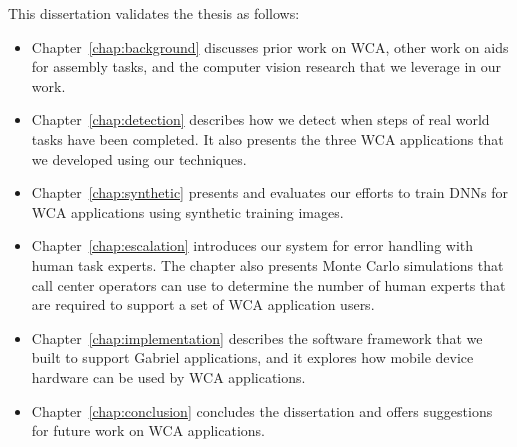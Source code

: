This dissertation validates the thesis as follows:
\begin{itemize}
\item Chapter~\ref{chap:background} discusses prior work on WCA, other work on
  aids for assembly tasks, and the computer vision research that we leverage in
  our work.
\item Chapter~\ref{chap:detection} describes how we detect when steps of real
  world tasks have been completed.
  It also presents the three WCA applications that we developed using our
  techniques.
\item Chapter~\ref{chap:synthetic} presents and evaluates our efforts to train
  DNNs for WCA applications using synthetic training images.
\item Chapter~\ref{chap:escalation} introduces our system for error handling
  with human task experts.
  The chapter also presents Monte Carlo simulations that call center operators
  can use to determine the number of human experts that are required to support
  a set of WCA application users.
\item Chapter~\ref{chap:implementation} describes the software framework that
  we built to support Gabriel applications, and it explores how mobile device
  hardware can be used by WCA applications.
\item Chapter~\ref{chap:conclusion} concludes the dissertation and offers
  suggestions for future work on WCA applications.
\end{itemize}
